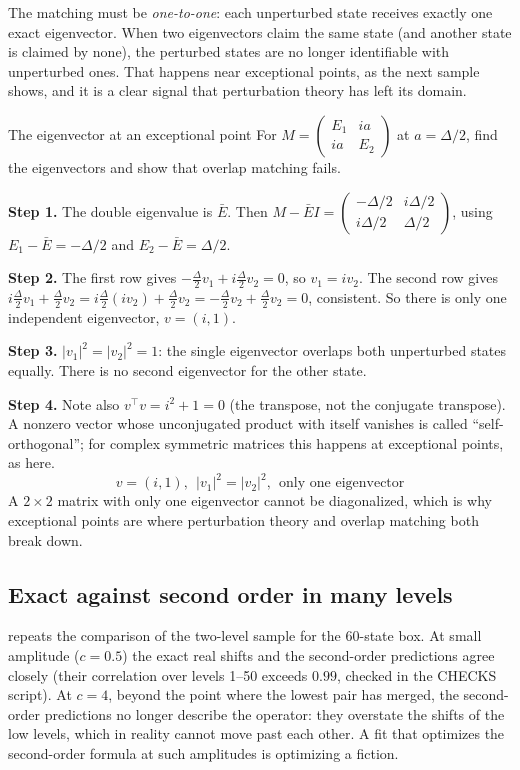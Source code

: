 The matching must be \emph{one-to-one}: each unperturbed state receives exactly one exact eigenvector. When two eigenvectors claim the same state (and another state is claimed by none), the perturbed states are no longer identifiable with unperturbed ones. That happens near exceptional points, as the next sample shows, and it is a clear signal that perturbation theory has left its domain.

\begin{sample}{The eigenvector at an exceptional point}
For $M=\begin{pmatrix}E_1&ia\\ia&E_2\end{pmatrix}$ at $a=\Delta/2$, find the eigenvectors and show that overlap matching fails.

\textbf{Step 1.} The double eigenvalue is $\bar E$. Then $M-\bar EI=\begin{pmatrix}-\Delta/2& i\Delta/2\\ i\Delta/2&\Delta/2\end{pmatrix}$, using $E_1-\bar E=-\Delta/2$ and $E_2-\bar E=\Delta/2$.

\textbf{Step 2.} The first row gives $-\tfrac\Delta2v_1+i\tfrac\Delta2v_2=0$, so $v_1=iv_2$. The second row gives $i\tfrac\Delta2v_1+\tfrac\Delta2v_2=i\tfrac\Delta2(iv_2)+\tfrac\Delta2 v_2 = -\tfrac\Delta2v_2+\tfrac\Delta2v_2=0$, consistent. So there is only one independent eigenvector, $v=(i,1)$.

\textbf{Step 3.} $|v_1|^2=|v_2|^2=1$: the single eigenvector overlaps both unperturbed states equally. There is no second eigenvector for the other state.

\textbf{Step 4.} Note also $v^\top v = i^2+1 = 0$ (the transpose, not the conjugate transpose). A nonzero vector whose unconjugated product with itself vanishes is called ``self-orthogonal''; for complex symmetric matrices this happens at exceptional points, as here.
\[
\boxed{v=(i,1),\ \ |v_1|^2=|v_2|^2,\ \ \text{only one eigenvector}}
\]
A $2\times2$ matrix with only one eigenvector cannot be diagonalized, which is why exceptional points are where perturbation theory and overlap matching both break down.
\end{sample}

\subsection{Exact against second order in many levels}

 repeats the comparison of the two-level sample for the 60-state box. At small amplitude ($c=0.5$) the exact real shifts and the second-order predictions agree closely (their correlation over levels 1--50 exceeds $0.99$, checked in the CHECKS script). At $c=4$, beyond the point where the lowest pair has merged, the second-order predictions no longer describe the operator: they overstate the shifts of the low levels, which in reality cannot move past each other. A fit that optimizes the second-order formula at such amplitudes is optimizing a fiction.

